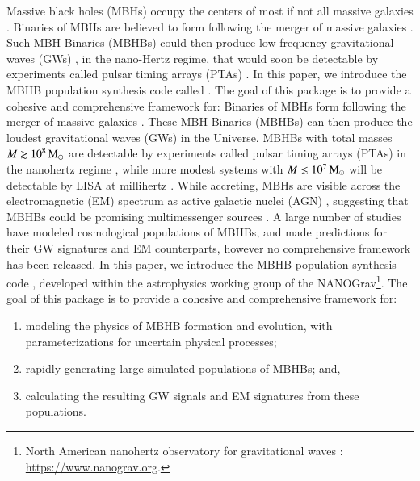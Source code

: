 \documentclass[useAMS, usenatbib]{mnras}
\begin{document}
    Massive black holes (MBHs) occupy the centers of most if not all massive galaxies \needcite{}.
    Binaries of MBHs are believed to form following the merger of massive galaxies \needcite{}.  Such MBH Binaries (MBHBs) could then produce low-frequency gravitational waves (GWs) , in the nano-Hertz regime, that would soon be detectable by experiments called pulsar timing arrays (PTAs) .  In this paper, we introduce the MBHB population synthesis code called \holodeck{}.  The goal of this package is to provide a cohesive and comprehensive framework for:
    Binaries of MBHs form following the merger of massive galaxies \needcite{}.  These MBH Binaries (MBHBs) can then produce the loudest gravitational waves (GWs) in the Universe.  MBHBs with total masses $M \gtrsim 10^8 \,\textrm{M}_{\odot}$ are detectable by experiments called pulsar timing arrays (PTAs)  in the nanohertz regime \needcite{}, while more modest systems with $M \lesssim 10^7 \, \textrm{M}_{\odot}$ will be detectable by LISA  at millihertz \needcite{}.  While accreting, MBHs are visible across the electromagnetic (EM) spectrum as active galactic nuclei (AGN) \needcite{}, suggesting that MBHBs could be promising multimessenger sources \needcite{}.  A large number of studies have modeled cosmological populations of MBHBs, and made predictions for their GW signatures and EM counterparts, however no comprehensive framework has been released.  In this paper, we introduce the MBHB population synthesis code \holodeck{}, developed within the astrophysics working group of the NANOGrav\footnote{North American nanohertz observatory for gravitational waves \citep{}: \url{https://www.nanograv.org}.}.  The goal of this package is to provide a cohesive and comprehensive framework for:
    \begin{enumerate}
        \item
        modeling the physics of MBHB formation and evolution, with parameterizations for uncertain physical processes;
        \item
        rapidly generating large simulated populations of MBHBs; and,
        \item
        calculating the resulting GW signals and EM signatures from these populations.
    \end{enumerate}
\end{document}
